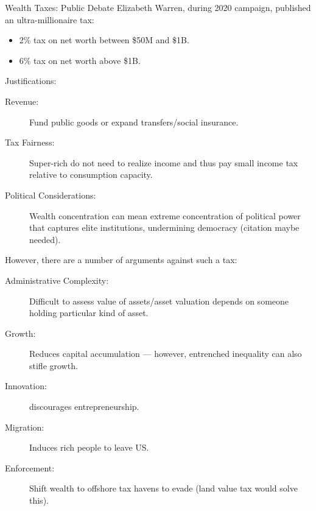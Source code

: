 \documentclass[10pt]{extarticle}
\begin{document}
  \begin{problem}{Wealth Taxes: Public Debate}
    Elizabeth Warren, during 2020 campaign, published an ultra-millionaire tax:
    \begin{itemize}
      \item 2\% tax on net worth between \$50M and \$1B.
      \item 6\% tax on net worth above \$1B.
    \end{itemize}
    Justifications:
    \begin{description}
      \item[Revenue:] Fund public goods or expand transfers/social insurance.
      \item[Tax Fairness:] Super-rich do not need to realize income and thus pay small income tax relative to consumption capacity.
      \item[Political Considerations:] Wealth concentration can mean extreme concentration of political power that captures elite institutions, undermining democracy (citation maybe needed).
    \end{description}
    However, there are a number of arguments against such a tax:
    \begin{description}
      \item[Administrative Complexity:] Difficult to assess value of assets/asset valuation depends on someone holding particular kind of asset.
      \item[Growth:] Reduces capital accumulation --- however, entrenched inequality can also stifle growth.
      \item[Innovation:] discourages entrepreneurship.
      \item[Migration:] Induces rich people to leave US.
      \item[Enforcement:] Shift wealth to offshore tax havens to evade (land value tax would solve this).
    \end{description}
  \end{problem}
\end{document}
